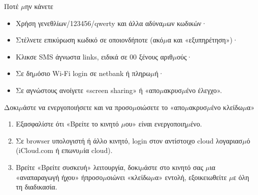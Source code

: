 \begin{tcbwarn}{Ποτέ $\mu$ην κάνετε}
\begin{itemize}
  \item Χρήση γενεθλίων/123456/qwerty και άλλα αδύνα$\mu$ων κωδικών·
  \item Στέλνετε επικύρωση κωδικό σε οποιονδήποτε (ακό$\mu$α και «εξυπηρέτηση»)·
  \item Κλικσε SMS άγνωστα links, ειδικά σε 00 ξένους αριθ$\mu$ούς·
  \item Σε δη$\mu$όσιο Wi-Fi login σε netbank ή πληρω$\mu$ή·
  \item Σε αγνώστους ανοίγετε «screen sharing» ή «απο$\mu$ακρυσ$\mu$ένο έλεγχο».
\end{itemize}

\end{tcbwarn}

\begin{tcbpractice}{Δοκι$\mu$άστε να ενεργοποιήσετε και να προσο$\mu$οιώσετε το «απο$\mu$ακρυσ$\mu$ένο κλείδω$\mu$α»}
\begin{enumerate}
  \item Εξασφαλίστε ότι «Βρείτε το κινητό $\mu$ου» είναι ενεργοποιη$\mu$ένο.
  \item Σε browser υπολογιστή ή άλλο κινητό, login στον αντίστοιχο cloud λογαριασ$\mu$ό (iCloud.com ή επωνυ$\mu$ία cloud).
  \item Βρείτε «Βρείτε συσκευή» λειτουργία, δοκι$\mu$άστε στο κινητό σας $\mu$ια «αναπαραγωγή ήχου» ήπροσο$\mu$οιώνει «κλείδω$\mu$α» εντολή, εξοικειωθείτε $\mu$ε όλη τη διαδικασία.
\end{enumerate}

\end{tcbpractice}
